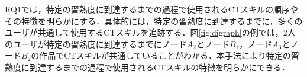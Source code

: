 \documentclass[submit,ses,noauthor]{ipsj}
\begin{document}
RQ1では，特定の習熟度に到達するまでの過程で使用されるCTスキルの順序やその特徴を明らかにする．具体的には，特定の習熟度に到達するまでに，多くのユーザが共通して使用するCTスキルを追跡する．図\ref{fig:digraph}の例では，2人のユーザが特定の習熟度に到達するまでにノード$A_2$とノード$B_1$，ノード$A_3$とノード$B_2$の作品でCTスキルが共通していることがわかる．本手法により特定の習熟度に到達するまでの過程で使用されるCTスキルの特徴を明らかにできる．



\end{document}
